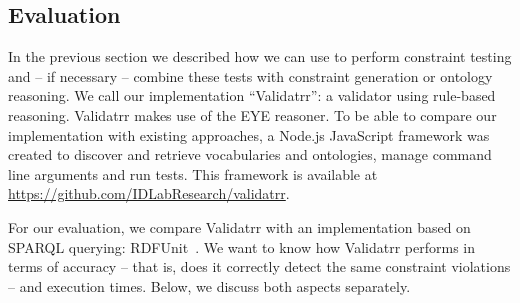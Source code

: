 \subsection{Evaluation}
In the previous section we described how we can use \nthree to perform constraint testing and -- if necessary -- combine these tests with constraint generation or ontology reasoning.
We call our implementation \enquote{Validatrr}: a validator using rule-based reasoning. Validatrr makes use of the EYE reasoner.
To be able to compare our implementation with existing approaches, a Node.js JavaScript framework was created
to discover and retrieve vocabularies and ontologies, manage command line arguments and run tests.
This framework is available at \url{https://github.com/IDLabResearch/validatrr}.

For our evaluation, we compare Validatrr with an implementation based on SPARQL querying: RDFUnit~\cite{kontokostas2014test}. 
We want to know how Validatrr performs in terms of accuracy -- that is, does it correctly detect the same constraint violations -- and execution times. Below, we discuss both aspects separately.

